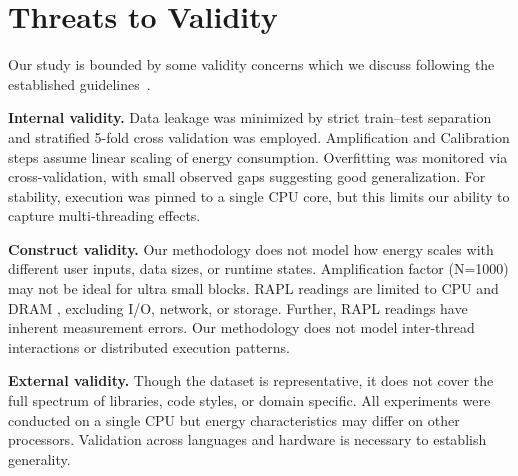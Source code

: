 \section{Threats to Validity}
\label{sec:threats}
Our study is bounded by some validity concerns which we discuss following the established guidelines~\cite{10.5555/2349018}.

\textbf{Internal validity.}  
Data leakage was minimized by strict train–test separation and stratified 5-fold cross validation was employed. Amplification and Calibration steps assume linear scaling of energy consumption. Overfitting was monitored via cross-validation, with small observed gaps suggesting good generalization. For stability, execution was pinned to a single CPU core, but this limits our ability to capture multi-threading effects.

\textbf{Construct validity.}  
Our methodology does not model how energy scales with different user inputs, data sizes, or runtime states. Amplification factor (N=1000) may not be ideal for ultra small blocks.  RAPL readings are limited to CPU and DRAM , excluding I/O, network, or storage. Further, RAPL readings have inherent measurement errors. Our methodology does not model inter-thread interactions or distributed execution patterns.

\textbf{External validity.}  
 Though the dataset is representative, it does not cover the full spectrum of libraries, code styles, or domain specific. All experiments were conducted on a single CPU but energy characteristics may differ on other processors. Validation across languages and hardware is necessary to establish generality.





